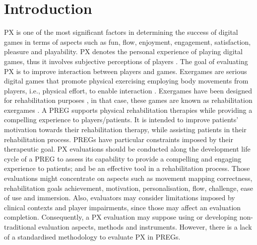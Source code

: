 \chapter{Introduction} %
\label{ch:intro}

\ac{PX} is one of the most significant factors in determining the success of digital games in terms of aspects such as fun, flow, enjoyment, engagement, satisfaction, pleasure and playability. \ac{PX} denotes the personal experience of playing digital games, thus it involves subjective perceptions of players \autocite{Wiemeyer2016,Chu2011}. The goal of evaluating \ac{PX} is to improve interaction between players and games. 
Exergames are serious digital games that promote physical exercising \autocite{PirovanoAdvisor2012} employing body movements from players, i.e., physical effort, to enable interaction \autocite{Mueller2015}. Exergames have been designed for rehabilitation purposes \autocite{Brokaw2015,Hernandez2013,Lewis2012,Burke2009}, in that case, these games are known as rehabilitation exergames \autocite{Mader2012}. A \ac{PREG} supports physical rehabilitation therapies while providing a compelling experience to players/patients. It is intended to improve patients’ motivation towards their rehabilitation therapy, while assisting patients in their rehabilitation process.
\acp{PREG} have particular constraints imposed by their therapeutic goal.
\ac{PX} evaluations should be conducted along the development life cycle of a \ac{PREG} to assess its capability to provide a compelling and engaging experience to patients; and be an effective tool in a rehabilitation process. Those evaluations might concentrate on aspects such as movement mapping correctness, rehabilitation goals achievement, motivation, personalisation, flow, challenge, ease of use and immersion. Also, evaluators may consider limitations imposed by clinical contexts and player impairments, since those may affect an evaluation completion. Consequently, a \ac{PX} evaluation may suppose using or developing non-traditional evaluation aspects, methods and instruments. However, there is a lack of a standardised methodology to evaluate \ac{PX} in \acp{PREG}.

